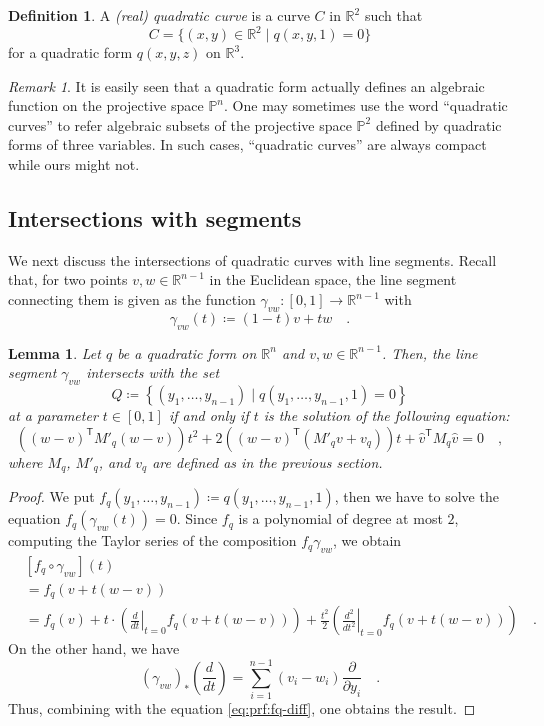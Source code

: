 \documentclass[pdftex,a4paper,12pt]{scrartcl}
\theoremstyle{plain}
\newtheorem{lemma}[theorem]{Lemma}
\theoremstyle{definition}
\newtheorem*{definition}{Definition}
\theoremstyle{remark}
\newtheorem{remark}[theorem]{Remark}
\begin{document}
\begin{definition}
A \emph{(real) quadratic curve} is a curve $C$ in $\mathbb R^2$ such that
\[
C=\{(x,y)\in\mathbb R^2\mid q(x,y,1)=0\}
\]
for a quadratic form $q(x,y,z)$ on $\mathbb R^3$.
\end{definition}

\begin{remark}
It is easily seen that a quadratic form actually defines an algebraic function on the projective space $\mathbb P^n$.
One may sometimes use the word ``quadratic curves'' to refer algebraic subsets of the projective space $\mathbb P^2$ defined by quadratic forms of three variables.
In such cases, ``quadratic curves'' are always compact while ours might not.
\end{remark}

\subsection{Intersections with segments}

We next discuss the intersections of quadratic curves with line segments.
Recall that, for two points $v,w\in\mathbb R^{n-1}$ in the Euclidean space, the line segment connecting them is given as the function $\gamma_{vw}:[0,1]\to\mathbb R^{n-1}$ with
\[
\gamma_{vw}(t)\coloneqq (1-t)v + tw
\quad.
\]

\begin{lemma}
Let $q$ be a quadratic form on $\mathbb R^n$ and $v,w\in\mathbb R^{n-1}$.
Then, the line segment $\gamma_{vw}$ intersects with the set
\[
Q\coloneqq \left\{(y_1,\dots,y_{n-1})\mid q(y_1,\dots,y_{n-1},1)=0\right\}
\]
at a parameter $t\in[0,1]$ if and only if $t$ is the solution of the following equation:
\[
\left((w-v)^{\mathsf T}M'_q(w-v)\right)t^2
+ 2\left((w-v)^{\mathsf T}(M'_q v + v_q)\right)t
+ \widehat v^{\mathsf T}M_q \widehat v
= 0
\quad,
\]
where $M_q$, $M'_q$, and $v_q$ are defined as in the previous section.
\end{lemma}
\begin{proof}
We put $f_q(y_1,\dots,y_{n-1})\coloneqq q(y_1,\dots,y_{n-1},1)$, then we have to solve the equation $f_q(\gamma_{vw}(t))=0$.
Since $f_q$ is a polynomial of degree at most $2$, computing the Taylor series of the composition $f_q\gamma_{vw}$, we obtain
\[
\begin{split}
&[f_q\circ\gamma_{vw}](t) \\
&= f_q(v+t(w-v)) \\
&= f_q(v)
+ t\cdot\left(\left.\frac{d}{dt}\right|_{t=0} f_q(v+t(w-v))\right)
+ \frac{t^2}{2}\left(\left.\frac{d^2}{dt^2}\right|_{t=0} f_q(v+t(w-v))\right)
\quad.
\end{split}
\]
On the other hand, we have
\[
(\gamma_{vw})_\ast\left(\frac{d}{dt}\right)
= \sum_{i=1}^{n-1} (v_i-w_i)\frac\partial{\partial y_i}
\quad.
\]
Thus, combining with the equation \eqref{eq:prf:fq-diff}, one obtains the result.
\end{proof}
\end{document}
